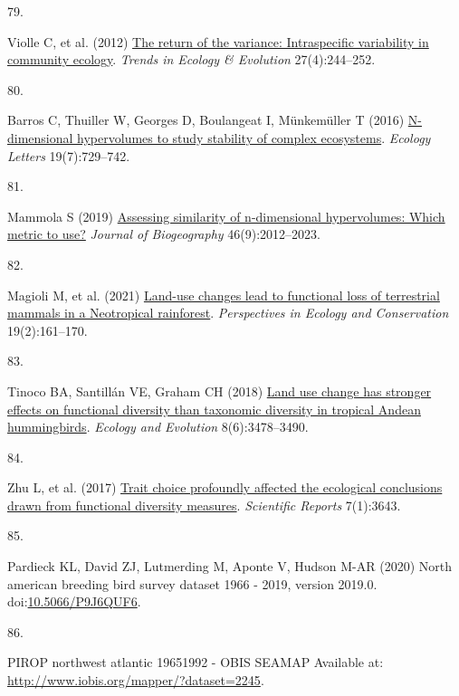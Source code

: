 \documentclass{article}
\newlength{\cslhangindent}
\newlength{\csllabelwidth}
\newlength{\cslentryspacingunit} %
\newenvironment{CSLReferences}[2] %
 {%
  \setlength{\parindent}{0pt}
  \ifodd #1
  \let\oldpar\par
  \def\par{\hangindent=\cslhangindent\oldpar}
  \fi
  \setlength{\parskip}{#2\cslentryspacingunit}
 }%
 {}
\newcommand{\CSLLeftMargin}[1]{\parbox[t]{\csllabelwidth}{#1}}
\newcommand{\CSLRightInline}[1]{\parbox[t]{\linewidth - \csllabelwidth}{#1}\break}
\begin{document}
\begin{CSLReferences}{0}{0}
\leavevmode{}%
\CSLLeftMargin{79. }%
\CSLRightInline{Violle C, et al. (2012)
\href{https://doi.org/10.1016/j.tree.2011.11.014}{The return of the
variance: Intraspecific variability in community ecology}. \emph{Trends
in Ecology \& Evolution} 27(4):244--252.}

\leavevmode{}%
\CSLLeftMargin{80. }%
\CSLRightInline{Barros C, Thuiller W, Georges D, Boulangeat I,
Münkemüller T (2016)
\href{https://doi.org/10.1111/ele.12617}{N-dimensional hypervolumes to
study stability of complex ecosystems}. \emph{Ecology Letters}
19(7):729--742.}

\leavevmode{}%
\CSLLeftMargin{81. }%
\CSLRightInline{Mammola S (2019)
\href{https://doi.org/10.1111/jbi.13618}{Assessing similarity of
n-dimensional hypervolumes: Which metric to use?} \emph{Journal of
Biogeography} 46(9):2012--2023.}

\leavevmode{}%
\CSLLeftMargin{82. }%
\CSLRightInline{Magioli M, et al. (2021)
\href{https://doi.org/10.1016/j.pecon.2021.02.006}{Land-use changes lead
to functional loss of terrestrial mammals in a Neotropical rainforest}.
\emph{Perspectives in Ecology and Conservation} 19(2):161--170.}

\leavevmode{}%
\CSLLeftMargin{83. }%
\CSLRightInline{Tinoco BA, Santillán VE, Graham CH (2018)
\href{https://doi.org/10.1002/ece3.3813}{Land use change has stronger
effects on functional diversity than taxonomic diversity in tropical
Andean hummingbirds}. \emph{Ecology and Evolution} 8(6):3478--3490.}

\leavevmode{}%
\CSLLeftMargin{84. }%
\CSLRightInline{Zhu L, et al. (2017)
\href{https://doi.org/10.1038/s41598-017-03812-8}{Trait choice
profoundly affected the ecological conclusions drawn from functional
diversity measures}. \emph{Scientific Reports} 7(1):3643.}

\leavevmode{}%
\CSLLeftMargin{85. }%
\CSLRightInline{Pardieck KL, David ZJ, Lutmerding M, Aponte V, Hudson
M-AR (2020) North american breeding bird survey dataset 1966 - 2019,
version 2019.0.
doi:\href{https://doi.org/10.5066/P9J6QUF6}{10.5066/P9J6QUF6}.}

\leavevmode{}%
\CSLLeftMargin{86. }%
\CSLRightInline{PIROP northwest atlantic 1965{\textendash}1992 - OBIS
SEAMAP Available at: \url{http://www.iobis.org/mapper/?dataset=2245}.}


\end{CSLReferences}
\end{document}
